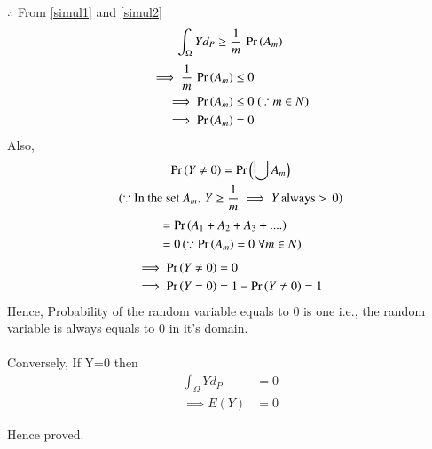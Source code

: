\documentclass[journal,12pt,twocolumn]{IEEEtran}
\begin{document}
$\therefore$ From \eqref{simul1} and \eqref{simul2}
\begin{align}
  \int_\Omega Yd_P \geq \frac{1}{m}\,\Pr\left(A_m\right)
\end{align}
\begin{align}
    \implies \frac{1}{m}\,\Pr\left(A_m\right) &\leq 0\\
    \implies \Pr\left(A_m\right) &\leq 0\;(\because m \in N)\\
    \implies \Pr\left(A_m\right) &= 0
\end{align}
Also,
\begin{multline}
    \Pr\left(Y \neq 0\right) = \Pr\left(\bigcup A_m\right)\\(\because \text{In the set } A_m,\,Y \geq \frac{1}{m} \implies Y\,\text{always}> \,0)
\end{multline}
\begin{align}
    &= \Pr\left(A_1 + A_2 + A_3 + ....\right)\\
    &= 0\,(\because \Pr\left(A_m\right) = 0\;\forall m \in N)
\end{align}
\begin{align}
  \implies \Pr\left(Y \neq 0\right) &= 0\\
  \implies \Pr\left(Y =0\right) &= 1- \Pr\left(Y \neq 0\right) = 1
\end{align}
Hence, Probability of the random variable equals to 0 is one i.e., the random variable is always equals to 0 in it's domain.\\\\
Conversely, If Y=0 then
\begin{align}
    \int_\Omega Yd_P &=0\\ 
    \implies E(Y) &=0 
\end{align}

Hence proved.
\end{document}
